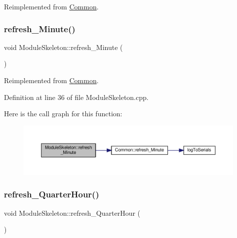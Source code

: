 Reimplemented from \hyperlink{class_common_a14e4462a94bd118028ce1d487ca0292c}{Common}.

\mbox{\label{class_module_skeleton_ada46fe93dc55850a1ccfb80d2a4ee5dd}} 
\subsubsection{\texorpdfstring{refresh\+\_\+\+Minute()}{refresh\_Minute()}\hspace{0.1cm}{\footnotesize\ttfamily [2/2]}}
{\footnotesize\ttfamily void Module\+Skeleton\+::refresh\+\_\+\+Minute (\begin{DoxyParamCaption}{ }\end{DoxyParamCaption})\hspace{0.3cm}{\ttfamily [virtual]}}



Reimplemented from \hyperlink{class_common_a14e4462a94bd118028ce1d487ca0292c}{Common}.



Definition at line 36 of file Module\+Skeleton.\+cpp.

Here is the call graph for this function\+:
\nopagebreak
\begin{figure}[H]
\begin{center}
\leavevmode
\includegraphics[width=350pt]{class_module_skeleton_ada46fe93dc55850a1ccfb80d2a4ee5dd_cgraph}
\end{center}
\end{figure}
\mbox{\label{class_module_skeleton_ade7e1fee2417a8e23a1f8f31502045ab}} 
\subsubsection{\texorpdfstring{refresh\+\_\+\+Quarter\+Hour()}{refresh\_QuarterHour()}\hspace{0.1cm}{\footnotesize\ttfamily [1/2]}}
{\footnotesize\ttfamily void Module\+Skeleton\+::refresh\+\_\+\+Quarter\+Hour (\begin{DoxyParamCaption}{ }\end{DoxyParamCaption})\hspace{0.3cm}{\ttfamily [virtual]}}



